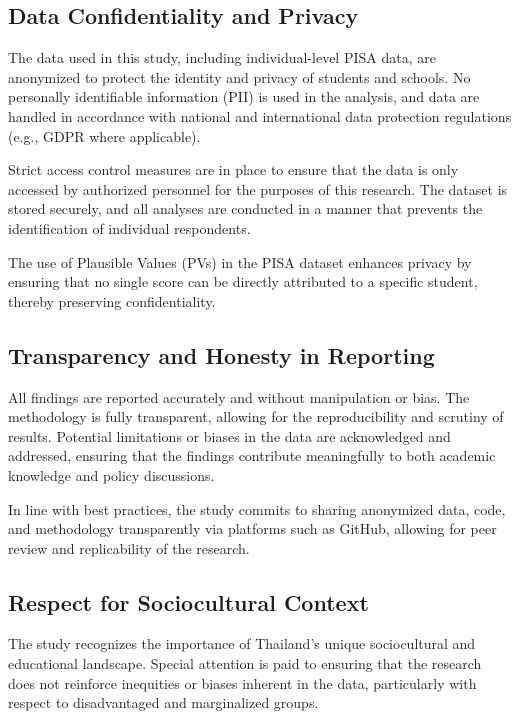 \documentclass[
]{article}
\begin{document}
\hypertarget{data-confidentiality-and-privacy}{%
\subsection{Data Confidentiality and
Privacy}\label{data-confidentiality-and-privacy}}

The data used in this study, including individual-level PISA data, are
anonymized to protect the identity and privacy of students and schools.
No personally identifiable information (PII) is used in the analysis,
and data are handled in accordance with national and international data
protection regulations (e.g., GDPR where applicable).

Strict access control measures are in place to ensure that the data is
only accessed by authorized personnel for the purposes of this research.
The dataset is stored securely, and all analyses are conducted in a
manner that prevents the identification of individual respondents.

The use of Plausible Values (PVs) in the PISA dataset enhances privacy
by ensuring that no single score can be directly attributed to a
specific student, thereby preserving confidentiality.

\hypertarget{transparency-and-honesty-in-reporting}{%
\subsection{Transparency and Honesty in
Reporting}\label{transparency-and-honesty-in-reporting}}

All findings are reported accurately and without manipulation or bias.
The methodology is fully transparent, allowing for the reproducibility
and scrutiny of results. Potential limitations or biases in the data are
acknowledged and addressed, ensuring that the findings contribute
meaningfully to both academic knowledge and policy discussions.

In line with best practices, the study commits to sharing anonymized
data, code, and methodology transparently via platforms such as GitHub,
allowing for peer review and replicability of the research.

\hypertarget{respect-for-sociocultural-context}{%
\subsection{Respect for Sociocultural
Context}\label{respect-for-sociocultural-context}}

The study recognizes the importance of Thailand's unique sociocultural
and educational landscape. Special attention is paid to ensuring that
the research does not reinforce inequities or biases inherent in the
data, particularly with respect to disadvantaged and marginalized
groups.
\end{document}
